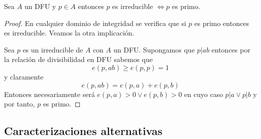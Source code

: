 \begin{proposition}
Sea $A$ un DFU y $p \in A$ entonces $p$ es irreducible 
$ \iff p$ es primo. 
\end{proposition}
\begin{proof}
En cualquier dominio de integridad se verifica que si $p$ es primo entonces es irreducible. Veamos la otra implicación. 

Sea $p$ es un irreducible de $A$ con $A$ un DFU. Supongamos que $p|ab$ entonces por la relación de divisibilidad en DFU sabemos que $$e(p,ab) \ge e(p,p) = 1$$ y claramente $$e(p,ab) = e(p,a) + e(p,b)$$ Entonces necesariamente será $e(p,a) > 0 \lor e(p,b) > 0$ en cuyo caso $p|a \lor p|b$ y por tanto, $p$ es primo. 
\end{proof}

\subsection{Caracterizaciones alternativas}

